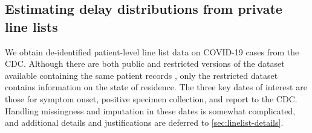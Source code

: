 






\subsection{Estimating delay distributions from private line lists}
\label{sec:delaystop}

We obtain de-identified patient-level line list data on COVID-19 cases from the
CDC. Although there are both public and restricted versions of the dataset
available containing the same patient records \citep{cdc2020casepub,
cdc2020caserestr}, only the restricted dataset contains information on the state
of residence. The three key dates of interest are those for symptom onset,
positive specimen collection, and report to the CDC. Handling missingness and
imputation in these dates is somewhat complicated, and additional details and
justifications are deferred to \autoref{sec:linelist-details}.

